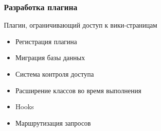 \documentclass[unicode]{beamer}
\begin{document}

\begin{frame}
\transwipe[direction=90]
\frametitle{Разработка плагина}
\begin{block}{Плагин, ограничивающий доступ к вики-страницам}
\begin{itemize}
  \item Регистрация плагина
  \item Миграция базы данных
  \item Система контроля доступа
  \item Расширение классов во время выполнения
  \item Hooks
  \item Маршрутизация запросов
\end{itemize}
\end{block}
\end{frame}
\end{document}
